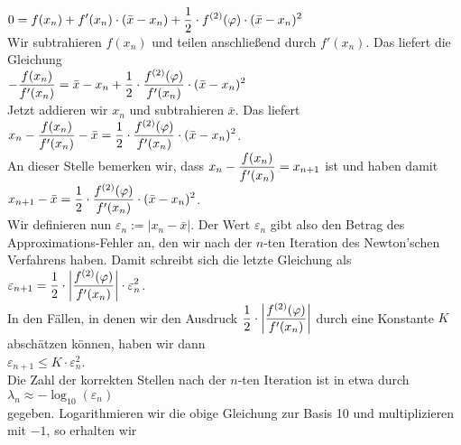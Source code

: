 \\[0.2cm]
\hspace*{1.3cm}
$\displaystyle 0 =  f(x_n) + f'(x_n) \cdot (\bar{x} - x_n) + \frac{1}{2} \cdot f^{(2)}(\varphi) \cdot (\bar{x} - x_n)^2$
\\[0.2cm]
Wir subtrahieren $f(x_n)$ und teilen anschlie{\ss}end durch $f'(x_n)$.  Das liefert die Gleichung
\\[0.2cm]
\hspace*{1.3cm}
$\displaystyle - \frac{f(x_n)}{f'(x_n)} = 
 \bar{x} - x_n + \frac{1}{2} \cdot \frac{f^{(2)}(\varphi)}{f'(x_n)} \cdot (\bar{x} - x_n)^2$
\\[0.2cm]
Jetzt addieren wir $x_n$ und subtrahieren $\bar{x}$.  Das liefert
\\[0.2cm]
\hspace*{1.3cm}
$\displaystyle x_n - \frac{f(x_n)}{f'(x_n)} - \bar{x} = 
 \frac{1}{2} \cdot \frac{f^{(2)}(\varphi)}{f'(x_n)} \cdot (\bar{x} - x_n)^2
$.
\\[0.2cm]
An dieser Stelle bemerken wir, dass $\displaystyle x_n - \frac{f(x_n)}{f'(x_n)} = x_{n+1}$ ist und haben damit
\\[0.2cm]
\hspace*{1.3cm}
$\displaystyle x_{n+1} - \bar{x} = \frac{1}{2} \cdot \frac{f^{(2)}(\varphi)}{f'(x_n)} \cdot (\bar{x} - x_n)^2$.
\\[0.2cm]
Wir definieren nun $\varepsilon_n := |x_n - \bar{x}|$.  Der Wert $\varepsilon_n$ gibt also den
Betrag des Approximations-Fehler an, den wir nach der $n$-ten Iteration des Newton'schen Verfahrens
haben.  Damit schreibt sich die letzte Gleichung als
\\[0.2cm]
\hspace*{1.3cm}
$\displaystyle \varepsilon_{n+1} = \frac{1}{2} \cdot \left|\frac{f^{(2)}(\varphi)}{f'(x_n)}\right| \cdot \varepsilon_n^2$.
\\[0.2cm]
In den F\"allen, in denen  wir den Ausdruck 
$\displaystyle \frac{1}{2} \cdot \left|\frac{f^{(2)}(\varphi)}{f'(x_n)}\right|$ 
durch
eine Konstante $K$ absch\"atzen k\"onnen, haben wir dann
\\[0.2cm]
\hspace*{1.3cm}
$\varepsilon_{n+1} \leq  K \cdot \varepsilon_{n}^2$.
\\[0.2cm]
Die Zahl der korrekten Stellen nach der $n$-ten Iteration ist in etwa durch
\\[0.2cm]
\hspace*{1.3cm}
$\lambda_{n} \approx -\log_{10}(\varepsilon_n)$ 
\\[0.2cm]
gegeben.  Logarithmieren wir die obige Gleichung zur Basis 10 und multiplizieren mit $-1$, so erhalten wir

